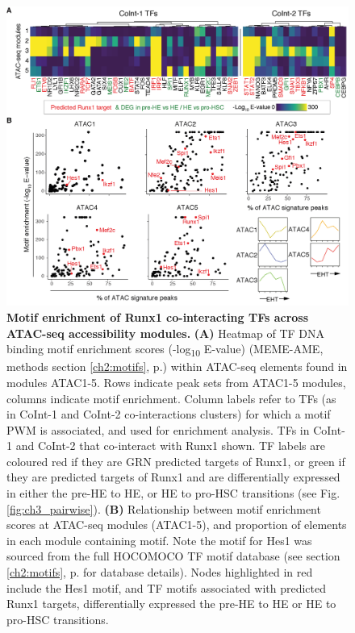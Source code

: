 \begin{figure}[!t]
    \centering
    \includegraphics[width=\textwidth,height=\textheight,keepaspectratio]{figures/chapter3/ch3_runx1-TF-motifs.png}
    \caption[{Motif enrichment of Runx1 co-interacting TFs across ATAC-seq accessibility modules.}]
    {\textbf{Motif enrichment of Runx1 co-interacting TFs across ATAC-seq accessibility modules.} 
    \textbf{(A)} Heatmap of TF DNA binding motif enrichment scores (-log\textsubscript{10} E-value) (MEME-AME, methods section \ref{ch2:motifs}, p.\pageref{ch2:motifs}) within ATAC-seq elements found in modules ATAC1-5. Rows indicate peak sets from ATAC1-5 modules, columns indicate motif enrichment. Column labels refer to TFs (as in CoInt-1 and CoInt-2 co-interactions clusters) for which a motif PWM is associated, and used for enrichment analysis. TFs in CoInt-1 and CoInt-2 that co-interact with Runx1 shown. TF labels are coloured red if they are GRN predicted targets of Runx1, or green if they are predicted targets of Runx1 and are differentially expressed in either the pre-HE to HE, or HE to pro-HSC transitions (see Fig. \ref{fig:ch3_pairwise}). 
    \textbf{(B)} Relationship between motif enrichment scores at ATAC-seq modules (ATAC1-5), and proportion of elements in each module containing motif. Note the motif for Hes1 was sourced from the full HOCOMOCO TF motif database (see section \ref{ch2:motifs}, p.\pageref{ch2:motifs} for database details). Nodes highlighted in red include the Hes1 motif, and TF motifs associated with predicted Runx1 targets, differentially expressed the pre-HE to HE or HE to pro-HSC transitions.
    }
    \label{fig:ch3_runx1-TF-motifs}
\end{figure}

